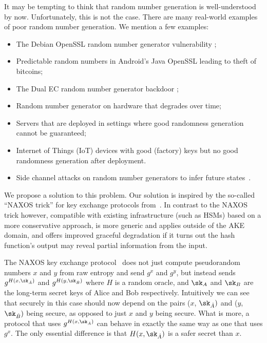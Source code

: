 \documentclass{article}
\begin{document}
It may be tempting to think that random number generation is well-understood by now. Unfortunately, this is not the case. There are many 
real-world examples of poor random number generation. We mention a few examples:
\begin{itemize}
\item The Debian OpenSSL random number generator vulnerability \cite{DebianRNGflaw, DebianRNGflawTLSDHE};

\item Predictable random numbers in Android's Java OpenSSL \cite{MarvinGoogle2013} leading to theft of bitcoins;

\item The Dual EC random number generator backdoor \cite{DualECstandardisedbackdoor};

\item Random number generator on hardware that degrades over time;

\item Servers that are deployed in settings where good randomness generation cannot be guaranteed;

\item Internet of Things (IoT) devices with good (factory) keys but no good randomness generation after deployment.

\item Side channel attacks on random number generators to infer future states~\cite{cryptoeprint:2019:996}.
\end{itemize}

We propose a solution to this problem. Our solution is inspired by the
so-called ``NAXOS trick'' for key exchange protocols
from~\cite{LaMacchiaeCK2007}. In contrast to the NAXOS trick however,
compatible with existing infrastructure (such as HSMs) based on a more
conservative approach, is more generic and applies outside of the AKE domain,
and offers improved graceful degradation if it turns out the hash function's
output may reveal partial information from the input.

The NAXOS key exchange protocol~\cite{LaMacchiaeCK2007} does not just compute pseudorandom numbers $x$ and $y$ from raw entropy and send $g^{x}$ and $g^{y}$, but instead sends $g^{H(x, \sk_{\hat A})}$ and $g^{H(y, \sk_{\hat B})}$ where $H$ is a random oracle, and $\sk_{A}$ and $\sk_{B}$ are the long-term secret keys of Alice and Bob respectively. Intuitively we can see that securely in this case should now depend on the pairs ($x$, $\sk_{\hat A})$ and ($y$, $\sk_{\hat B})$ being secure, as opposed to just $x$ and $y$ being secure. What is more, a protocol that uses $g^{H(x, \sk_{\hat A})}$ can behave in exactly the same way as one that uses $g^x$. The only essential difference is that $H(x, \sk_{\hat A})$ is a safer secret than $x$.
\end{document}
